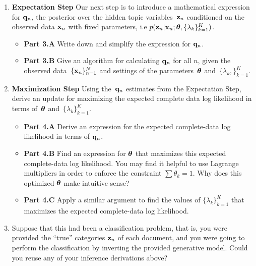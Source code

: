 \documentclass[submit]{harvardml}
\begin{document}
\begin{problem}
\begin{enumerate}
\item \textbf{Expectation Step}
Our next step is to introduce a mathematical expression for $\mathbf{q}_n$, the posterior over the hidden topic variables~$\mathbf{z}_n$ conditioned on the observed data $\mathbf{x}_n$ with fixed parameters, i.e $p(\mathbf{z}_n | \mathbf{x}_n; \boldsymbol{\theta}, \{ \lambda_k \}^K_{k=1})$.

\begin{itemize}
\item  \textbf{Part 3.A } Write down and simplify the expression for $\mathbf{q}_n$. 
\item  \textbf{Part 3.B } Give an algorithm for calculating $\mathbf{q}_n$ for all $n$, given the observed data~$\{\mathbf{x}_n\}^N_{n=1}$ and settings of the parameters~$\boldsymbol{\theta}$ and~$\{ \lambda_k,  \}^K_{k=1}$.

\end{itemize}

\item \textbf{Maximization Step}
Using the~$\mathbf{q}_n$ estimates from the Expectation Step, derive an update for maximizing the expected complete data log likelihood in terms of~$\boldsymbol{\theta}$ and~$\{ \lambda_k \}^K_{k=1}$.

\begin{itemize}
    \item \textbf{Part 4.A } Derive an expression for the expected complete-data log likelihood in terms of $\mathbf{q}_n$.
    \item \textbf{Part 4.B } Find an expression for $\boldsymbol{\theta}$ that maximizes this expected complete-data log likelihood. You may find it helpful to use Lagrange multipliers in order to enforce the constraint $\sum \theta_k = 1$. Why does this optimized $\boldsymbol{\theta}$ make intuitive sense?
    \item \textbf{Part 4.C } Apply a similar argument to find the values of $\{\lambda_k
      \}^K_{k = 1}$ that maximizes the expected complete-data log likelihood.
\end{itemize}

\item Suppose that this had been a classification problem, that is,
  you were provided the ``true'' categories $\mathbf{z}_n$ of each
  document, and you were going to perform the classification by
  inverting the provided generative model.  Could you reuse any of
  your inference derivations above?  
  
\end{enumerate}


  
\end{problem}
\end{document}
